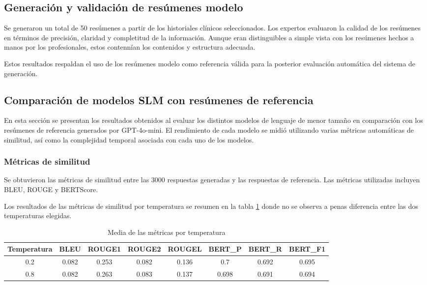 \documentclass[../main.tex]{subfiles}
\begin{document}
\subsection{Generación y validación de resúmenes modelo}

Se generaron un total de 50 resúmenes a partir de los historiales clínicos seleccionados.
Los expertos evaluaron la calidad de los resúmenes en términos de precisión, claridad y completitud de la información. Aunque eran distinguibles a simple vista con los resúmenes hechos a manos por los profesionales, estos contennían los contenidos y estructura adecuada.

Estos resultados respaldan el uso de los resúmenes modelo como referencia válida para la posterior evaluación automática del sistema de generación.

\subsection{Comparación de modelos SLM con resúmenes de referencia}

En esta sección se presentan los resultados obtenidos al evaluar los distintos modelos de lenguaje de menor tamaño en comparación con los resúmenes de referencia generados por GPT-4o-mini. El rendimiento de cada modelo se midió utilizando varias métricas automáticas de similitud, así como la complejidad temporal asociada con cada uno de los modelos.

\subsubsection{Métricas de similitud}

Se obtuvieron las métricas de similitud entre las 3000 respuestas generadas y las respuestas de referencia. Las métricas utilizadas incluyen BLEU, ROUGE y BERTScore.

Los resultados de las métricas de similitud por temperatura se resumen en la tabla \ref{tab:metricas_temperatura} donde no se observa a penas diferencia entre las dos temperaturas elegidas. 

\begin{table}[H]
    \centering
    \caption{Media de las métricas por temperatura}
    \label{tab:metricas_temperatura}
    \renewcommand{\arraystretch}{1.2}
    \begin{tabular}{c|ccccccc}
        \hline
        \textbf{Temperatura} & \textbf{BLEU} & \textbf{ROUGE1} & \textbf{ROUGE2} & \textbf{ROUGEL} & \textbf{BERT\_P} & \textbf{BERT\_R} & \textbf{BERT\_F1} \\
        \hline
        0.2 & 0.082 & 0.253 & 0.082 & 0.136 & 0.7 & 0.692 & 0.695 \\
        0.8 & 0.082 & 0.263 & 0.083 & 0.137 & 0.698 & 0.691 & 0.694 \\
        \hline
    \end{tabular}

\end{table}
\end{document}

